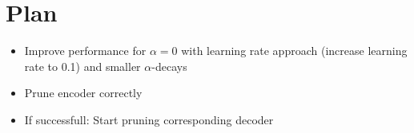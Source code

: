 \documentclass[10pt,twocolumn,letterpaper]{article}
\begin{document}
\section{Plan}
\begin{itemize}
	\item Improve performance for $\alpha=0$ with learning rate approach (increase learning rate to 0.1) and smaller $\alpha$-decays
	\item Prune encoder correctly
	\item If successfull: Start pruning corresponding decoder
\end{itemize}

{\small


}
\end{document}
